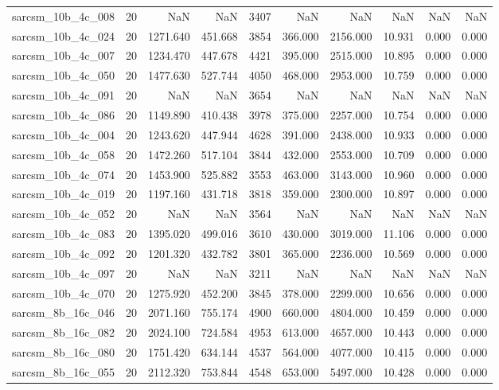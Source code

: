 \begin{tabular}{lrrrrrrrrr}
sarcsm\_10b\_4c\_008 & 20 & NaN & NaN & 3407 & NaN & NaN & NaN & NaN & NaN \\
sarcsm\_10b\_4c\_024 & 20 & 1271.640 & 451.668 & 3854 & 366.000 & 2156.000 & 10.931 & 0.000 & 0.000 \\
sarcsm\_10b\_4c\_007 & 20 & 1234.470 & 447.678 & 4421 & 395.000 & 2515.000 & 10.895 & 0.000 & 0.000 \\
sarcsm\_10b\_4c\_050 & 20 & 1477.630 & 527.744 & 4050 & 468.000 & 2953.000 & 10.759 & 0.000 & 0.000 \\
sarcsm\_10b\_4c\_091 & 20 & NaN & NaN & 3654 & NaN & NaN & NaN & NaN & NaN \\
sarcsm\_10b\_4c\_086 & 20 & 1149.890 & 410.438 & 3978 & 375.000 & 2257.000 & 10.754 & 0.000 & 0.000 \\
sarcsm\_10b\_4c\_004 & 20 & 1243.620 & 447.944 & 4628 & 391.000 & 2438.000 & 10.933 & 0.000 & 0.000 \\
sarcsm\_10b\_4c\_058 & 20 & 1472.260 & 517.104 & 3844 & 432.000 & 2553.000 & 10.709 & 0.000 & 0.000 \\
sarcsm\_10b\_4c\_074 & 20 & 1453.900 & 525.882 & 3553 & 463.000 & 3143.000 & 10.960 & 0.000 & 0.000 \\
sarcsm\_10b\_4c\_019 & 20 & 1197.160 & 431.718 & 3818 & 359.000 & 2300.000 & 10.897 & 0.000 & 0.000 \\
sarcsm\_10b\_4c\_052 & 20 & NaN & NaN & 3564 & NaN & NaN & NaN & NaN & NaN \\
sarcsm\_10b\_4c\_083 & 20 & 1395.020 & 499.016 & 3610 & 430.000 & 3019.000 & 11.106 & 0.000 & 0.000 \\
sarcsm\_10b\_4c\_092 & 20 & 1201.320 & 432.782 & 3801 & 365.000 & 2236.000 & 10.569 & 0.000 & 0.000 \\
sarcsm\_10b\_4c\_097 & 20 & NaN & NaN & 3211 & NaN & NaN & NaN & NaN & NaN \\
sarcsm\_10b\_4c\_070 & 20 & 1275.920 & 452.200 & 3845 & 378.000 & 2299.000 & 10.656 & 0.000 & 0.000 \\
sarcsm\_8b\_16c\_046 & 20 & 2071.160 & 755.174 & 4900 & 660.000 & 4804.000 & 10.459 & 0.000 & 0.000 \\
sarcsm\_8b\_16c\_082 & 20 & 2024.100 & 724.584 & 4953 & 613.000 & 4657.000 & 10.443 & 0.000 & 0.000 \\
sarcsm\_8b\_16c\_080 & 20 & 1751.420 & 634.144 & 4537 & 564.000 & 4077.000 & 10.415 & 0.000 & 0.000 \\
sarcsm\_8b\_16c\_055 & 20 & 2112.320 & 753.844 & 4548 & 653.000 & 5497.000 & 10.428 & 0.000 & 0.000 \\

\end{tabular}

